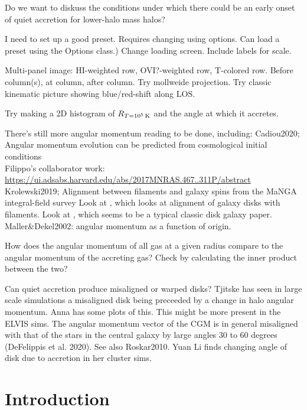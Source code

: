 \documentclass[fleqn,usenatbib]{mnras}
\newcommand{\Rcon}{R_{T=10^5\,{\rm K}}}
\begin{document}
Do we want to diskuss the conditions under which there could be an early onset of quiet accretion for lower-halo mass halos?

I need to set up a good preset. Requires changing using options. Can load a preset using the Options class.)
Change loading screen.
Include labels for scale.

Multi-panel image:
HI-weighted row,
OVI?-weighted row,
T-colored row.
Before column(s), at column, after column.
Try mollweide projection.
Try classic kinematic picture showing blue/red-shift along LOS.

Try making a 2D histogram of $\Rcon$ and the angle at which it accretes.

There's still more angular momentum reading to be done, including:
Cadiou2020; Angular momentum evolution can be predicted from cosmological initial conditions\\
Filippo's collaborator work: \url{https://ui.adsabs.harvard.edu/abs/2017MNRAS.467..311P/abstract}\\
Krolewski2019; Alignment between filaments and galaxy spins from the {MaNGA} integral-field survey
Look at \cite{Bird2019}, which looks at alignment of galaxy disks with filaments.
Look at \cite{Bird2020}, which seems to be a typical classic disk galaxy paper.
Maller\&Dekel2002: angular momentum as a function of origin.

How does the angular momentum of all gas at a given radius compare to the angular momentum of the accreting gas?
Check by calculating the inner product between the two?

Can quiet accretion produce misaligned or warped disks?
Tjitske has seen in large scale simulations a misaligned disk being preceeded by a change in halo angular momentum.
Anna has some plots of this. This might be more present in the ELVIS sims.
The angular momentum vector of the CGM is in general misaligned with that of the stars in the central galaxy by large angles  30 to 60 degrees (DeFelippis et al. 2020).
See also Roskar2010.
Yuan Li finds changing angle of disk due to accretion in her cluster sims.

\section{Introduction}
\label{s: introduction}
\end{document}
